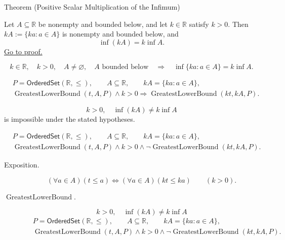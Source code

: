 \begin{theorembox}{Theorem (Positive Scalar Multiplication of the Infimum)}
\begin{theorem}
\label{thm:positive-scalar-mult-infimum}
Let $A\subseteq\mathbb{R}$ be nonempty and bounded below, and let
$k\in\mathbb{R}$ satisfy $k>0$.  Then $kA:=\{ka:a\in A\}$ is nonempty and
bounded below, and
\[
  \inf(kA)=k\inf A.
\]
\hyperref[prf:positive-scalar-mult-infimum]{Go to proof.}
\end{theorem}
\end{theorembox}

\begin{remark*}
\[
k\in\mathbb{R},\quad k>0,\quad A\neq\varnothing,\quad A\text{ bounded below}
\quad\Longrightarrow\quad
\inf\{ka:a\in A\}=k\inf A.
\]
\end{remark*}

\begin{remark*}
\[
\begin{aligned}
&P=\mathsf{OrderedSet}(\mathbb{R},\leq),\qquad A\subseteq\mathbb{R},\qquad kA=\{ka:a\in A\},\\
&\operatorname{GreatestLowerBound}(t,A,P)\land k>0
\Longrightarrow
\operatorname{GreatestLowerBound}(kt,kA,P).
\end{aligned}
\]
\end{remark*}

\begin{remark*}
\[
k>0,\quad \inf(kA)\neq k\inf A
\]
is impossible under the stated hypotheses.
\end{remark*}

\begin{remark*}
\[
\begin{aligned}
&P=\mathsf{OrderedSet}(\mathbb{R},\leq),\qquad A\subseteq\mathbb{R},\qquad kA=\{ka:a\in A\},\\
&\operatorname{GreatestLowerBound}(t,A,P)\land k>0\land
\neg\operatorname{GreatestLowerBound}(kt,kA,P).
\end{aligned}
\]
\end{remark*}

\begin{remark*}
\begin{description}
  \item[Exposition.]
\[
(\forall a\in A)(t\leq a)
\Longleftrightarrow
(\forall a\in A)(kt\leq ka)
\qquad(k>0).
\]


  \item[\(\operatorname{GreatestLowerBound}.\)]
  \[
k>0,\quad \inf(kA)\neq k\inf A
\]
\[
\begin{aligned}
&P=\mathsf{OrderedSet}(\mathbb{R},\leq),\qquad A\subseteq\mathbb{R},\qquad kA=\{ka:a\in A\},\\
&\operatorname{GreatestLowerBound}(t,A,P)\land k>0\land
\neg\operatorname{GreatestLowerBound}(kt,kA,P).
\end{aligned}
\]
\end{description}
\end{remark*}

